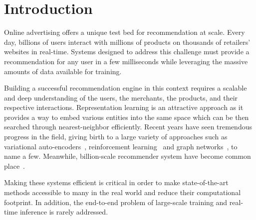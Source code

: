 \documentclass[sigconf]{acmart}
\begin{document}

\graphicspath{ {fig/} }




\maketitle

\section{Introduction}
\label{introduction}

Online advertising offers a unique test bed for recommendation at scale. Every day, billions of users interact with millions of products on thousands of retailers' websites in real-time. Systems designed to address this challenge must provide a recommendation for any user in a few milliseconds while leveraging the massive amounts of data available for training. 



Building a successful recommendation engine in this context requires a scalable and deep understanding of the users, the merchants, the products, and their respective interactions. Representation learning is an attractive approach as it provides a way to embed various entities into the same space which can be then searched through nearest-neighbor efficiently. Recent years have seen tremendous progress in the field, giving birth to a large variety of approaches such as variational auto-encoders~\cite{variational-liang-2018, gated-vaes, rec-vae, ease-vae}, reinforcement learning~\cite{ract-cf} and graph networks~\cite{graph-networks-pinterest-kdd-2018, alibaba-intentgc-kdd-2019, alibaba-m2glr-kdd-2020, pixie-pinterest-www-2018}, to name a few. Meanwhile, billion-scale recommender system have become common place~\cite{pixie-pinterest-www-2018, alibaba-intentgc-kdd-2019, alibaba-m2glr-kdd-2020, alibaba-graphs-kdd-2018}. 

Making these systems efficient is critical in order to make state-of-the-art methods accessible to many in the real world and reduce their computational footprint. In addition, the end-to-end problem of large-scale training and real-time inference is rarely addressed. 
\end{document}
